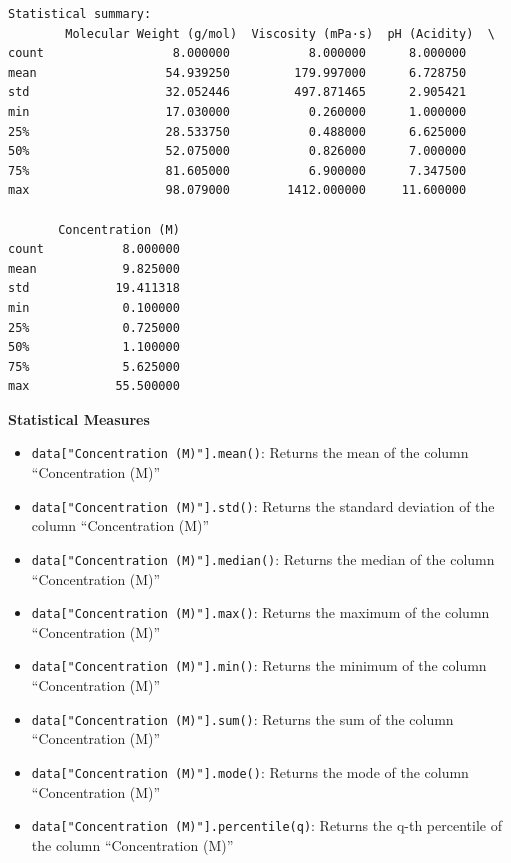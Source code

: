 \documentclass[
  letterpaper,
  DIV=11,
  numbers=noendperiod]{scrreprt}
\providecommand{\tightlist}{%
  \setlength{\itemsep}{0pt}\setlength{\parskip}{0pt}}\usepackage{longtable,booktabs,array}
\begin{document}
\begin{verbatim}
Statistical summary: 
        Molecular Weight (g/mol)  Viscosity (mPa·s)  pH (Acidity)  \
count                  8.000000           8.000000      8.000000   
mean                  54.939250         179.997000      6.728750   
std                   32.052446         497.871465      2.905421   
min                   17.030000           0.260000      1.000000   
25%                   28.533750           0.488000      6.625000   
50%                   52.075000           0.826000      7.000000   
75%                   81.605000           6.900000      7.347500   
max                   98.079000        1412.000000     11.600000   

       Concentration (M)  
count           8.000000  
mean            9.825000  
std            19.411318  
min             0.100000  
25%             0.725000  
50%             1.100000  
75%             5.625000  
max            55.500000  
\end{verbatim}

\textbf{Statistical Measures}

\begin{itemize}
\tightlist
\item
  \texttt{data{[}"Concentration\ (M)"{]}.mean()}: Returns the mean of
  the column ``Concentration (M)''
\item
  \texttt{data{[}"Concentration\ (M)"{]}.std()}: Returns the standard
  deviation of the column ``Concentration (M)''
\item
  \texttt{data{[}"Concentration\ (M)"{]}.median()}: Returns the median
  of the column ``Concentration (M)''
\item
  \texttt{data{[}"Concentration\ (M)"{]}.max()}: Returns the maximum of
  the column ``Concentration (M)''
\item
  \texttt{data{[}"Concentration\ (M)"{]}.min()}: Returns the minimum of
  the column ``Concentration (M)''
\item
  \texttt{data{[}"Concentration\ (M)"{]}.sum()}: Returns the sum of the
  column ``Concentration (M)''
\item
  \texttt{data{[}"Concentration\ (M)"{]}.mode()}: Returns the mode of
  the column ``Concentration (M)''
\item
  \texttt{data{[}"Concentration\ (M)"{]}.percentile(q)}: Returns the
  q-th percentile of the column ``Concentration (M)''
\end{itemize}
\end{document}
